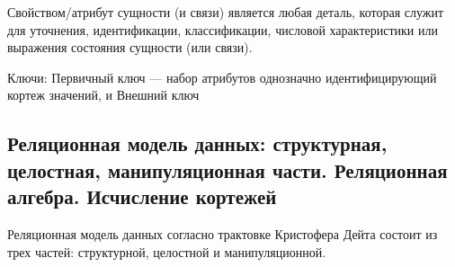 Свойством/атрибут сущности (и связи) является любая деталь, которая служит для уточнения, идентификации, классификации, числовой характеристики или выражения состояния сущности (или связи).

Ключи: Первичный ключ --- набор атрибутов однозначно идентифицирующий кортеж значений, и Внешний ключ

\subsection{Реляционная модель данных: структурная, целостная, манипуляционная части. Реляционная алгебра. Исчисление кортежей}

Реляционная модель данных согласно трактовке Кристофера Дейта состоит из трех частей: структурной, целостной и манипуляционной.

